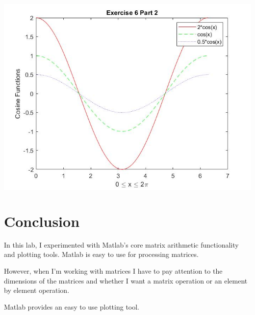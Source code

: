 \documentclass[11pt]{article}
\begin{document}
\includegraphics[width=\textwidth]{E6_pt2.jpg}

\section{Conclusion}
In this lab, I experimented with Matlab's core matrix arithmetic functionality and plotting tools. Matlab is easy to use for processing matrices.

However, when I'm working with matrices I have to pay attention to the dimensions of the matrices and whether I want a matrix operation or an element by element operation.

Matlab provides an easy to use plotting tool.
\end{document}

